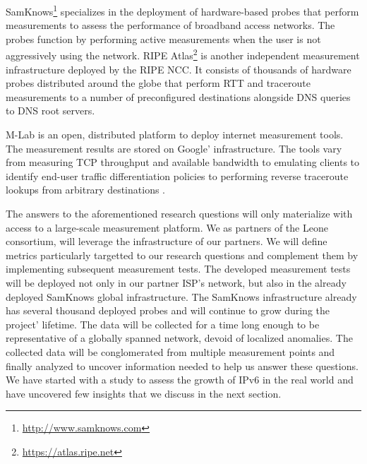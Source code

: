 SamKnows\footnote{\url{http://www.samknows.com}} specializes in the deployment
of hardware-based probes that perform measurements to assess the performance
of broadband access networks. The probes function by performing active
measurements when the user is not aggressively using the network.  RIPE
Atlas\footnote{\url{https://atlas.ripe.net}} is another independent
measurement infrastructure deployed by the \ac{RIPE NCC}. It consists of
thousands of hardware probes distributed around the globe that perform
\ac{RTT} and traceroute measurements to a number of preconfigured destinations
alongside DNS queries to DNS root servers.

\ac{M-Lab} \cite{dovrolis:2010} is an open, distributed platform to deploy
internet measurement tools. The measurement results are stored on Google'
infrastructure. The tools vary from measuring TCP throughput and available
bandwidth to emulating clients to identify end-user traffic differentiation
policies \cite{dischinger:2010, kanuparthy:2011} to performing reverse
traceroute lookups from arbitrary destinations \cite{bassett:2010}.

The answers to the aforementioned research questions will only materialize
with access to a large-scale measurement platform. We as partners of the Leone
consortium, will leverage the infrastructure of our partners. We will define
metrics particularly targetted to our research questions and complement them
by implementing subsequent measurement tests. The developed measurement tests
will be deployed not only in our partner \ac{ISP}'s network, but also in the
already deployed SamKnows global infrastructure.  The SamKnows infrastructure
already has several thousand deployed probes and will continue to grow during
the project' lifetime. The data will be collected for a time long enough to be
representative of a globally spanned network, devoid of localized anomalies.
The collected data will be conglomerated from multiple measurement points and
finally analyzed to uncover information needed to help us answer these
questions. We have started with a study to assess the growth of IPv6 in the
real world and have uncovered few insights that we discuss in the next
section.
